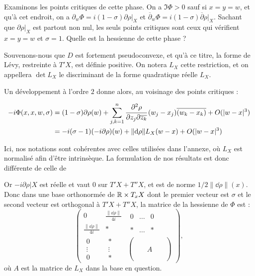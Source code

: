 Examinons les points critiques de cette phase. On a $\Im \Phi >0$ sauf si $x=y=w$, et qu'à cet endroit, on a $\partial_w\Phi = i(1-\sigma)\partial \rho|_X$ et $\overline{\partial}_w\Phi=i(1-\sigma)\overline{\partial}\rho|_X$. Sachant que $\partial \rho|_X$ est partout non nul, les seuls points critiques sont ceux qui vérifient $x=y=w$ et $\sigma =1$.
Quelle est la hessienne de cette phase ? 

Souvenons-nous que $D$ est fortement pseudoconvexe, et qu'à ce titre, la forme de Lévy, restreinte à $T'X$, est définie positive. On notera $L_X$ cette restriction, et on appellera $\det L_X$ le discriminant de la forme quadratique réelle $L_X$. 

Un développement à l'ordre $2$ donne alors, au voisinage des points critiques :

\begin{align*}
  -i\Phi(x,x,w,\sigma)&=(1-\sigma) \partial\rho(w) + \sum_{j,k=1}^n\cfrac{\partial^2\rho}{\partial z_j\partial \overline{z_k}}\,(w_j-x_j)\overline{(w_k-x_k)} + O(|w-x|^3)\\
  &= -i(\sigma-1) (-i\partial\rho)(w) + \|\mathrm{d}\rho\|L_{X}(w-x) + O(|w-x|^3)
\end{align*}

\begin{rem}
Ici, nos notations sont cohérentes avec celles utilisées dans l'annexe, où $L_X$ est normalisé afin d'être intrinsèque. La formulation de nos résultats est donc différente de celle de \cite{BoSj}
\end{rem}

Or $-i\partial \rho|X$ est réelle et vaut $0$ sur $T'X+T''X$, et est de norme $1/2 \|\dd\rho\|(x)$. Donc dans une base orthonormée de $\mathbb{R}\times T_xX$ dont le premier vecteur est $\sigma$ et le second vecteur est orthogonal à $T'X+T''X$, la matrice de la hessienne de $\Phi$ est :
\begin{equation*}
\begin{pmatrix}
  0 & \frac{\|\dd\rho\|}{4i} &\begin{matrix}0&\ldots & 0\end{matrix}\\
  \frac{\|\dd\rho\|}{4i} & * & \begin{matrix}*&\ldots & *\end{matrix}\\
  \begin{matrix}0\\\vdots\\0\end{matrix}& \begin{matrix}*\\\vdots\\*\end{matrix}&\begin{pmatrix}\phantom{A}&\phantom{A}&\phantom{A}\\\phantom{A}&A&\phantom{A}\\\phantom{A}&\phantom{A}&\phantom{A}\end{pmatrix}
\end{pmatrix},
\end{equation*}
où $A$ est la matrice de $L_X$ dans la base en question. 

